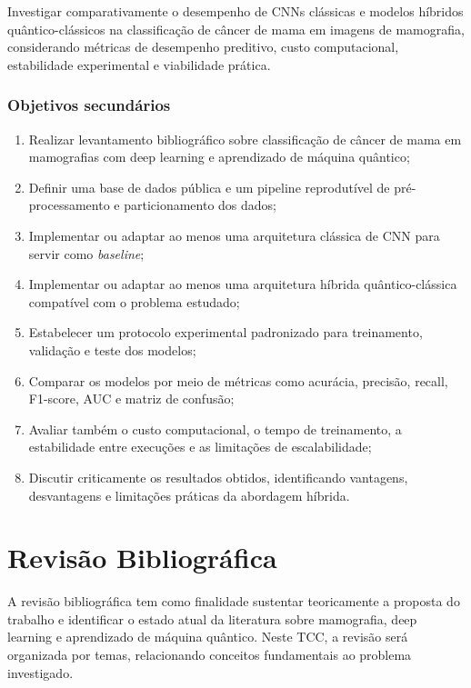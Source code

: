\documentclass[
    12pt,
    openright,
    oneside,
    a4paper,
    english,
    brazil
]{abntex2}
\begin{document}
Investigar comparativamente o desempenho de CNNs clássicas e modelos híbridos quântico-clássicos na classificação de câncer de mama em imagens de mamografia, considerando métricas de desempenho preditivo, custo computacional, estabilidade experimental e viabilidade prática.

\subsection{Objetivos secundários}
\label{subsec:objetivos_secundarios}

\begin{enumerate}
    \item Realizar levantamento bibliográfico sobre classificação de câncer de mama em mamografias com deep learning e aprendizado de máquina quântico;
    \item Definir uma base de dados pública e um pipeline reprodutível de pré-processamento e particionamento dos dados;
    \item Implementar ou adaptar ao menos uma arquitetura clássica de CNN para servir como \textit{baseline};
    \item Implementar ou adaptar ao menos uma arquitetura híbrida quântico-clássica compatível com o problema estudado;
    \item Estabelecer um protocolo experimental padronizado para treinamento, validação e teste dos modelos;
    \item Comparar os modelos por meio de métricas como acurácia, precisão, recall, F1-score, AUC e matriz de confusão;
    \item Avaliar também o custo computacional, o tempo de treinamento, a estabilidade entre execuções e as limitações de escalabilidade;
    \item Discutir criticamente os resultados obtidos, identificando vantagens, desvantagens e limitações práticas da abordagem híbrida.
\end{enumerate}

\chapter{Revisão Bibliográfica}
\label{cap:revisao}

A revisão bibliográfica tem como finalidade sustentar teoricamente a proposta do trabalho e identificar o estado atual da literatura sobre mamografia, deep learning e aprendizado de máquina quântico. Neste TCC, a revisão será organizada por temas, relacionando conceitos fundamentais ao problema investigado.
\end{document}
